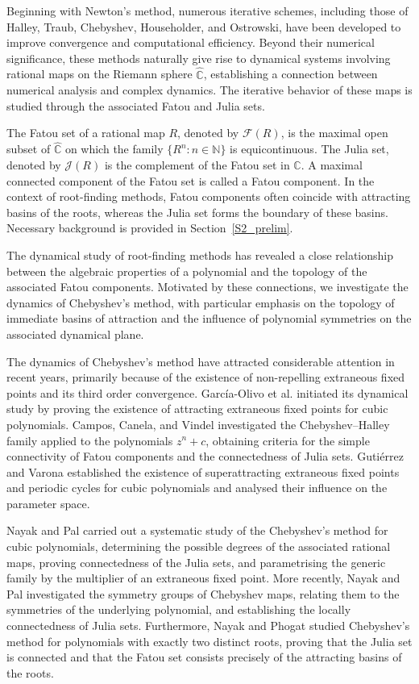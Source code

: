\documentclass[12pt]{article}
\begin{document}
	Beginning with Newton's method, numerous iterative schemes, including those of Halley, Traub, Chebyshev, Householder, and Ostrowski, have been developed to improve convergence and computational efficiency. Beyond their numerical significance, these methods naturally give rise to dynamical systems involving  rational maps on the Riemann sphere $\widehat{\mathbb C}$, establishing a connection between numerical analysis and complex dynamics. The iterative behavior of these maps is studied through the associated Fatou and Julia sets. 
	
	The Fatou set of a rational map $R$, denoted by $\mathcal{F}(R)$, is the maximal open subset of $\widehat{\mathbb{C}}$ on which the family $\{R^n:n\in\mathbb{N}\}$ is equicontinuous. The Julia set, denoted by  $\mathcal{J}(R)$ is the complement of the Fatou set in $\widehat{\mathbb{C}}$. A maximal connected component of the Fatou set is called a Fatou component.
	In the context of root-finding methods, Fatou components often coincide with attracting basins of the roots, whereas the Julia set forms the boundary of these basins. Necessary background is provided in Section~\ref{S2_prelim}.
	
	The dynamical study of root-finding methods has revealed a close relationship between the algebraic properties of a polynomial and the topology of the associated Fatou components. Motivated by these connections, we investigate the dynamics of Chebyshev's method, with particular emphasis on the topology of immediate basins of attraction and the influence of polynomial symmetries on the associated dynamical plane.
	
	The dynamics of Chebyshev's method have attracted considerable attention in recent years, primarily because of the existence of non-repelling extraneous fixed points and its third order convergence. Garc\'{i}a-Olivo et al. \cite{GGM2015} initiated its dynamical study by proving the existence of attracting extraneous fixed points for cubic polynomials. Campos, Canela, and Vindel \cite{CCV2020} investigated the Chebyshev--Halley family applied to the polynomials $z^n+c$, obtaining criteria for the simple connectivity of Fatou components and the connectedness of Julia sets. Guti\'{e}rrez and Varona \cite{GV2020} established the existence of superattracting extraneous fixed points and periodic cycles for cubic polynomials and analysed their influence on the parameter space.
	
	Nayak and Pal \cite{Nayak-Pal2022} carried out a systematic study of the  Chebyshev's method for cubic polynomials, determining the possible degrees of the associated rational maps, proving connectedness of the Julia sets, and parametrising the generic family by the multiplier of an extraneous fixed point. More recently, Nayak and Pal \cite{Sym_dyn} investigated the symmetry groups of Chebyshev maps, relating them to the symmetries of the underlying polynomial, and establishing the locally connectedness of Julia sets. Furthermore, Nayak and Phogat \cite{Nayak-Phogat2025} studied Chebyshev's method for polynomials with exactly two distinct roots, proving that the Julia set is connected and that the Fatou set consists precisely of the attracting basins of the roots. 
	
\end{document}
